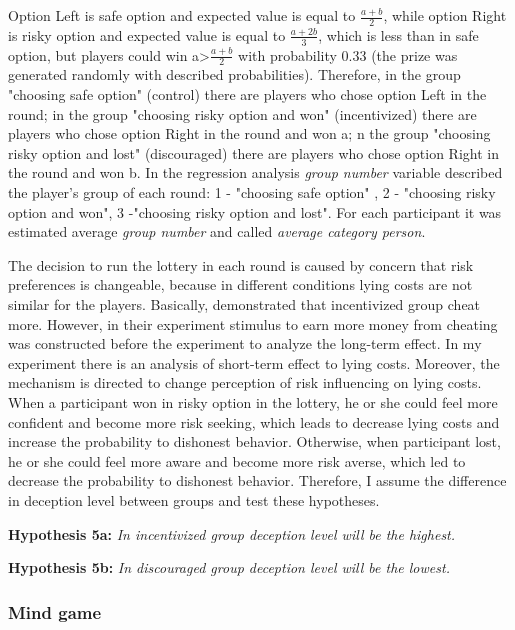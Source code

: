 \documentclass[12pt]{article}
\begin{document}
	Option Left is safe option and expected value is equal to $ \frac{a+b}{2}$, while option Right is risky option and expected value is equal to $ \frac{a+2b}{3}$, which is less than in safe option, but players could win a>$ \frac{a+b}{2}$ with probability 0.33 (the prize was generated randomly with described probabilities). Therefore, in the group "choosing safe option" (control) there are players who chose option Left in the round; in the group "choosing risky option and won" (incentivized) there are players who chose option Right in the round and won a; n the group "choosing risky option and lost" (discouraged) there are players who chose option Right in the round and won b. In the regression analysis \textit{group number} variable described the player's group of each round: 1 - "choosing safe option" , 2 - "choosing risky option and won", 3 -"choosing risky option and lost". For each participant it was estimated average \textit{group number} and called \textit{average category person}.
	
	The decision to run the lottery in each round is caused by concern that risk preferences is changeable, because in different conditions lying costs are not similar for the players. Basically, \cite{zimerman2014self} demonstrated that incentivized group cheat more. However, in their experiment stimulus to earn more money from cheating was constructed before the experiment to analyze the long-term effect. In my experiment there is an analysis of short-term effect to lying costs. Moreover, the mechanism is directed to change perception of risk influencing on lying costs. When a participant won in risky option in the lottery, he or she could feel more confident and become more risk seeking, which leads to decrease lying costs and increase the probability to dishonest behavior. Otherwise, when participant lost, he or she could feel more aware and become more risk averse, which led to decrease the probability to dishonest behavior. Therefore, I assume the difference in deception level between groups and test these hypotheses.

	
	\vspace{0.2cm}
	
	\textbf{Hypothesis 5a:}
	\textit{In incentivized group deception level will be the highest.}
	
	\textbf{Hypothesis 5b:}
	\textit{In discouraged group deception level will be the lowest.}
	
	
	\subsubsection{Mind game}
	
\end{document}
